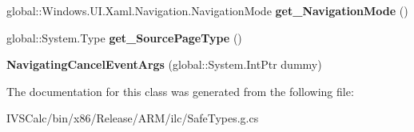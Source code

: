 \begin{DoxyCompactItemize}
global\+::\+Windows.\+U\+I.\+Xaml.\+Navigation.\+Navigation\+Mode {\bfseries get\+\_\+\+Navigation\+Mode} ()
\item 
\mbox{\label{class_windows_1_1_u_i_1_1_xaml_1_1_navigation_1_1_navigating_cancel_event_args_ae97b1c383ee491650382b71c20b3995f}} 
global\+::\+System.\+Type {\bfseries get\+\_\+\+Source\+Page\+Type} ()
\item 
\mbox{\label{class_windows_1_1_u_i_1_1_xaml_1_1_navigation_1_1_navigating_cancel_event_args_a453487078d7857bf5f014fc99fddf8eb}} 
{\bfseries Navigating\+Cancel\+Event\+Args} (global\+::\+System.\+Int\+Ptr dummy)
\end{DoxyCompactItemize}


The documentation for this class was generated from the following file\+:\begin{DoxyCompactItemize}
\item 
I\+V\+S\+Calc/bin/x86/\+Release/\+A\+R\+M/ilc/Safe\+Types.\+g.\+cs\end{DoxyCompactItemize}
